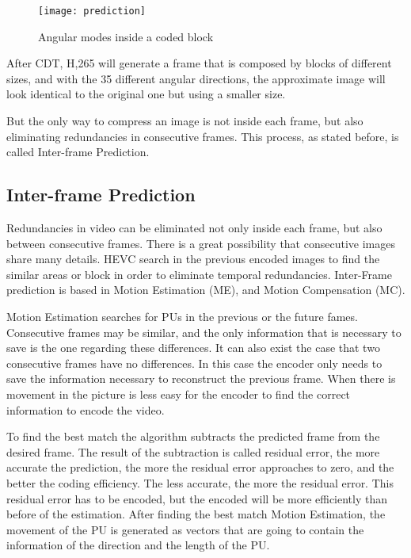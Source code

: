 \documentclass[10pt,journal,compsoc]{IEEEtran}
\begin{document}
\begin{figure}[h]
\texttt{[image: prediction]}
\caption{Angular modes inside a coded block \cite{inter}}
\label{fig:pred2}
\end{figure}

After CDT, H,265 will generate a frame that is composed by blocks of different sizes, and with the 35 different angular directions, the approximate image will look identical to the original one but using a smaller size.

But the only way to compress an image is not inside each frame, but also eliminating redundancies in consecutive frames. This process, as stated before, is called Inter-frame Prediction.

\subsection{Inter-frame Prediction}

Redundancies in video can be eliminated not only inside each frame, but also between consecutive frames. There is a great possibility that consecutive images share many details. HEVC search in the previous encoded images to find the similar areas or block in order to eliminate temporal redundancies. \cite{simple} Inter-Frame prediction is based in Motion Estimation (ME), and Motion Compensation (MC). \cite{inter}

Motion Estimation searches for PUs in the previous or the future fames. Consecutive frames may be similar, and the only information that is necessary to save is the one regarding these differences. It can also exist the case that two consecutive frames have no differences. In this case the encoder only needs to save the information necessary to reconstruct the previous frame. When there is movement in the picture is less easy for the encoder to find the correct information to encode the video. \cite{marshal}

To find the best match the algorithm subtracts the predicted frame from the desired frame. The result of the subtraction is called residual error, the more accurate the prediction, the more the residual error approaches to zero, and the better the coding efficiency. The less accurate, the more the residual error. This residual error has to be encoded, but the encoded will be more efficiently than before of the estimation. \cite{marshal}  After finding the best match Motion Estimation, the movement of the PU is generated as vectors that are going to contain the information of the direction and the length of the PU. \cite{inter}
\end{document}
